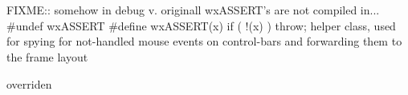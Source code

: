 %
%


\section{}\label{cbbarspy}


FIXME:: somehow in debug v. originall wxASSERT's are not compiled in...
\#undef  wxASSERT
\#define wxASSERT(x) if ( !(x) ) throw;
helper class, used for spying for not-handled mouse events on control-bars
and forwarding them to the frame layout






\label{cbbarspycbbarspy}





\label{cbbarspyprocessevent}


overriden


\label{cbbarspysetbarwindow}


